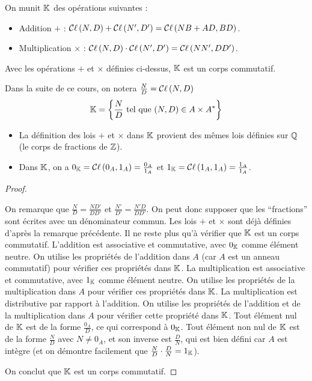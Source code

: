 \documentclass[12pt, a4paper]{report}
\begin{document}
\begin{definition}
    On munit $\mathbb{K}$ des opérations suivantes :
    \begin{itemize}
        \item Addition $+$ : $\mathcal{C}\ell\left(N,D\right) + \mathcal{C}\ell\left(N',D'\right) = \mathcal{C}\ell\left(NB + AD, BD\right)$.
        \item Multiplication $\times$ : $\mathcal{C}\ell\left(N,D\right) \cdot \mathcal{C}\ell\left(N',D'\right) = \mathcal{C}\ell\left(NN', DD'\right)$.
    \end{itemize}
\end{definition}

\begin{property}
    Avec les opérations $+$ et $\times$ définies ci-dessus, $\mathbb{K}$ est un corps commutatif.
\end{property}

\begin{importantbox}
    Dans la suite de ce cours, on notera $\frac ND = \mathcal{C}\ell\left(N, D\right)$
    $$\mathbb{K} = \left\{\frac ND \text{ tel que } (N, D) \in A \times A^*\right\} $$
\end{importantbox}

\begin{remark}
    \begin{itemize}
        \item La définition des lois $+$ et $\times$ dans $\mathbb{K}$ provient des mêmes lois définies sur $\mathbb{Q}$ (le corps de fractions de $\mathbb{Z}$).
        \item Dans $\mathbb{K}$, on a $0_{\mathbb{K}} = \mathcal{C}\ell\left(0_A, 1_A\right) = \frac{0_A}{1_A}$ et $1_{\mathbb{K}} = \mathcal{C}\ell\left(1_A, 1_A\right) = \frac{1_A}{1_A}$.
    \end{itemize}
\end{remark}

\begin{proof}
    \begin{outline}
        \1 On remarque que $\frac ND = \frac{ND'}{DD'}$ et $\frac{N'}{D'} = \frac{N'D}{DD'}$.
        \1 On peut donc supposer que les ``fractions'' sont écrites avec un dénominateur commun.
        \1 Les lois $+$ et $\times$ sont déjà définies d'après la remarque précédente.
        \1 Il ne reste plus qu'à vérifier que $\mathbb{K}$ est un corps commutatif.
        \2 L'addition est associative et commutative, avec $0_{\mathbb{K}}$ comme élément neutre. On utilise les propriétés de l'addition dans $A$ (car $A$ est un anneau commutatif) pour vérifier ces propriétés dans $\mathbb{K}$.
        \2 La multiplication est associative et commutative, avec $1_{\mathbb{K}}$ comme élément neutre. On utilise les propriétés de la multiplication dans $A$ pour vérifier ces propriétés dans $\mathbb{K}$.
        \2 La multiplication est distributive par rapport à l'addition. On utilise les propriétés de l'addition et de la multiplication dans $A$ pour vérifier cette propriété dans $\mathbb{K}$.
        \2 Tout élément nul de $\mathbb{K}$ est de la forme $\frac{0_A}{D}$, ce qui correspond à $0_{\mathbb{K}}$. Tout élément non nul de $\mathbb{K}$ est de la forme $\frac{N}{D}$ avec $N \neq 0_A$, et son inverse est $\frac{D}{N}$, qui est bien défini car $A$ est intègre (et on démontre facilement que $\frac{N}{D} \cdot \frac{D}{N} = 1_{\mathbb{K}}$).
    \end{outline}
    On conclut que $\mathbb{K}$ est un corps commutatif.
\end{proof}
\end{document}
